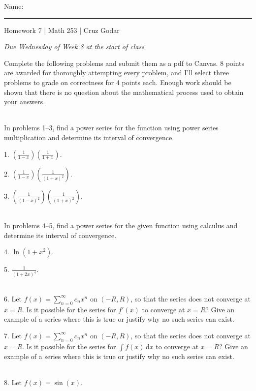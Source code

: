 \documentclass{article}
\begin{document}
\Large Name: \rule{2in}{0.15mm} \hfill Homework 7 | Math 253 | Cruz Godar \vspace{4pt} \normalsize

\textit{Due Wednesday of Week 8 at the start of class}

Complete the following problems and submit them as a pdf to Canvas. 8 points are awarded for thoroughly attempting every problem, and I'll select three problems to grade on correctness for 4 points each. Enough work should be shown that there is no question about the mathematical process used to obtain your answers.

~\\

In problems 1--3, find a power series for the function using power series multiplication and determine its interval of convergence.

1. $\displaystyle \left( \frac{1}{1 - x} \right)\left( \frac{1}{1 + x} \right)$.

2. $\displaystyle \left( \frac{1}{1 - x} \right)\left( \frac{1}{(1 + x)^2} \right)$.

3. $\displaystyle \left( \frac{1}{(1 - x)^2} \right)\left( \frac{1}{(1 + x)^2} \right)$.

~\\

In problems 4--5, find a power series for the given function using calculus and determine its interval of convergence.

4. $\displaystyle \ln\left( 1 + x^2 \right)$.

5. $\displaystyle \frac{1}{(1 + 2x)^4}$.

~\\

6. Let $\displaystyle f(x) = \sum_{n = 0}^\infty c_n x^n$ on $(-R, R)$, so that the series does not converge at $x = R$. Is it possible for the series for $f'(x)$ to converge at $x = R$? Give an example of a series where this is true or justify why no such series can exist.

7. Let $\displaystyle f(x) = \sum_{n = 0}^\infty c_n x^n$ on $(-R, R)$, so that the series does not converge at $x = R$. Is it possible for the series for $\displaystyle \int f(x)\,\text{d} x$ to converge at $x = R$? Give an example of a series where this is true or justify why no such series can exist.

~\\

8. Let $f(x) = \sin(x)$.
\end{document}
